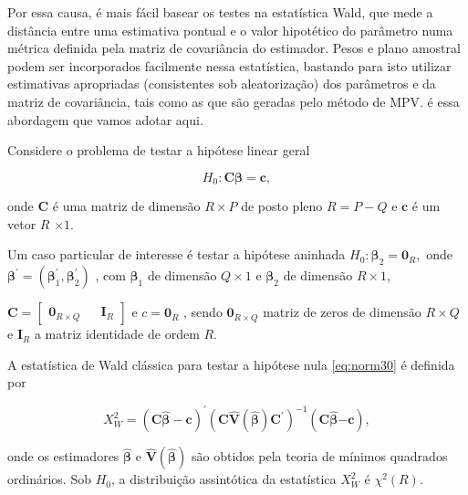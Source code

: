 \documentclass[]{book}
\theoremstyle{definition}
\theoremstyle{definition}
\theoremstyle{definition}
\theoremstyle{remark}
\begin{document}
Por essa causa, é mais fácil basear os testes na estatística Wald, que
mede a distância entre uma estimativa pontual e o valor hipotético do
parâmetro numa métrica definida pela matriz de covariância do estimador.
Pesos e plano amostral podem ser incorporados facilmente nessa
estatística, bastando para isto utilizar estimativas apropriadas
(consistentes sob aleatorização) dos parâmetros e da matriz de
covariância, tais como as que são geradas pelo método de MPV. é essa
abordagem que vamos adotar aqui.

Considere o problema de testar a hipótese linear geral

\begin{equation}
H_{0}:\mathbf{C\beta }=\mathbf{c},  \label{eq:norm30}
\end{equation}

onde \(\mathbf{C}\) é uma matriz de dimensão \(R\times P\) de posto
pleno \(R=P-Q\) e \(\mathbf{c}\) é um vetor \(R\) \(\times 1.\)

Um caso particular de interesse é testar a hipótese aninhada
\(H_{0}:\mathbf{\beta }_{2}=\mathbf{0}_{R}\mathbf{,}\) onde
\(\mathbf{\beta }^{\prime}=\left( \mathbf{\beta }_{1}^{\prime },\mathbf{\beta }_{2}^{\prime }\right)\)
, com \(\mathbf{\beta }_{1}\) de dimensão \(Q\times 1\) e
\(\mathbf{\beta}_{2}\) de dimensão \(R\times 1\),

\(\mathbf{C}= \left[\begin{array}{lll}\mathbf{0}_{R\times Q} & & \mathbf{I}_{R}\end{array}\right]\)
e \(c=\mathbf{0}_{R}\) , sendo \(\mathbf{0}_{R\times Q}\) matriz de
zeros de dimensão \(R\times Q\) e \(\mathbf{I}_{R}\) a matriz identidade
de ordem \(R\).

A estatística de Wald clássica para testar a hipótese nula
\eqref{eq:norm30} é definida por

\begin{equation}
X_{W}^{2}=\left( \mathbf{C}\widehat{\mathbf{\beta }}-\mathbf{c}\right)
^{\prime }\left( \mathbf{C}\widehat{\mathbf{V}}\left( \mathbf{\hat{\beta}}
\right) \mathbf{C}^{\prime }\right) ^{-1}\left( \mathbf{C}\widehat{\mathbf{
\beta }}\mathbf{-c}\right),  \label{eq:norm31}
\end{equation}

onde os estimadores \(\widehat{\mathbf{\beta }}\) e
\(\widehat{\mathbf{V}}\left( \mathbf{\hat{\beta}}\right)\) são obtidos
pela teoria de mínimos quadrados ordinários. Sob \(H_{0}\), a
distribuição assintótica da estatística \(X_{W}^{2}\) é
\(\chi ^{2}\left(R\right)\).
\end{document}

